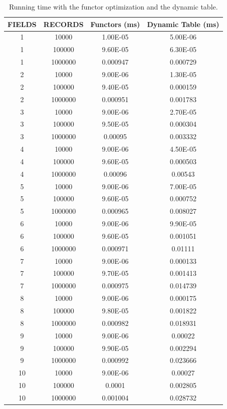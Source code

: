 \begin{table}	
	\caption{Running time with the functor optimization and the dynamic table.}
	\begin{tabular}{|c|c|c|c|}
		\hline
		\textbf{FIELDS}& \textbf{RECORDS}& \textbf{Functors (ms)}&\textbf{Dynamic Table (ms)}\\ \hline
		1&	10000&	1.00E-05& 5.00E-06\\ \hline
		1&	100000&	9.60E-05& 6.30E-05\\ \hline
		1&	1000000&	0.000947& 0.000729\\ \hline
		2&	10000&	9.00E-06& 1.30E-05\\ \hline
		2&	100000&	9.40E-05&0.000159\\ \hline
		2&	1000000&	0.000951&0.001783\\ \hline
		3&	10000&	9.00E-06&2.70E-05\\ \hline
		3&	100000&	9.50E-05&0.000304\\ \hline
		3&	1000000&	0.00095&0.003332\\ \hline
		4&	10000&	9.00E-06&4.50E-05\\ \hline
		4&	100000&	9.60E-05&0.000503\\ \hline
		4&	1000000&	0.00096&0.00543\\ \hline
		5&	10000&	9.00E-06&7.00E-05\\ \hline
		5&	100000&	9.60E-05&0.000752\\ \hline
		5&	1000000&	0.000965&0.008027\\ \hline
		6&	10000&	9.00E-06&9.90E-05\\ \hline
		6&	100000&	9.60E-05&0.001051\\ \hline
		6&	1000000&	0.000971&0.01111\\ \hline
		7&	10000&	9.00E-06&0.000133\\ \hline
		7&	100000&	9.70E-05&0.001413\\ \hline
		7&	1000000&	0.000975&0.014739\\ \hline
		8&	10000&	9.00E-06&0.000175\\ \hline
		8&	100000&	9.80E-05&0.001822\\ \hline
		8&	1000000&	0.000982&0.018931\\ \hline
		9&	10000&	9.00E-06&0.00022\\ \hline
		9&	100000&	9.90E-05&0.002294\\ \hline
		9&	1000000&	0.000992&0.023666\\ \hline
		10&	10000&	9.00E-06&0.00027\\ \hline
		10&	100000&	0.0001&	0.002805\\ \hline
		10&	1000000& 0.001004&	0.028732\\ \hline		
	\end{tabular}
	\label{tab:functors}
\end{table}

